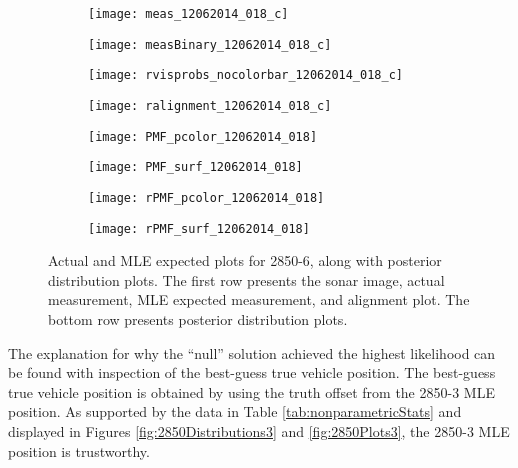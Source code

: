 \begin{figure} [h!]
	\centering
	\begin{subfigure}[b]{0.24\textwidth}
                \texttt{[image: meas\_12062014\_018\_c]}
                \caption{}
	\end{subfigure}
  	\centering
	\begin{subfigure}[b]{0.24\textwidth}
                \texttt{[image: measBinary\_12062014\_018\_c]}
		\caption{}
  	\end{subfigure}
  	\centering
	\begin{subfigure}[b]{0.24\textwidth}
                \texttt{[image: rvisprobs\_nocolorbar\_12062014\_018\_c]}
		\caption{}
  	\end{subfigure}
  	\centering
	\begin{subfigure}[b]{0.24\textwidth}
                \texttt{[image: ralignment\_12062014\_018\_c]}
		\caption{}
  	\end{subfigure}

	\centering
	\begin{subfigure}[b]{0.33\textwidth}
                \texttt{[image: PMF\_pcolor\_12062014\_018]}
		\caption{}
  	\end{subfigure}
  	\hspace{8ex}
  	\centering
	\begin{subfigure}[b]{0.33\textwidth}
                \texttt{[image: PMF\_surf\_12062014\_018]}
		\caption{}
  	\end{subfigure}
  	
  	\begin{subfigure}[b]{0.48\textwidth}
                \texttt{[image: rPMF\_pcolor\_12062014\_018]}
		\caption{}
  	\end{subfigure}
  	\centering
	\begin{subfigure}[b]{0.48\textwidth}
                \texttt{[image: rPMF\_surf\_12062014\_018]}
		\caption{}
  	\end{subfigure}
  	
	\caption{Actual and MLE expected plots for 2850-6, along with posterior distribution plots. The first row presents the sonar image, actual measurement, MLE expected measurement, and alignment plot. The bottom row presents posterior distribution plots.}
	\label{fig:badRes1}
\end{figure}

The explanation for why the ``null'' solution achieved the highest likelihood can be found with inspection of the best-guess true vehicle position.
The best-guess true vehicle position is obtained by using the truth offset from the 2850-3 MLE position.
As supported by the data in Table \ref{tab:nonparametricStats} and displayed in Figures \ref{fig:2850Distributions3} and \ref{fig:2850Plots3}, the 2850-3 MLE position is trustworthy.

